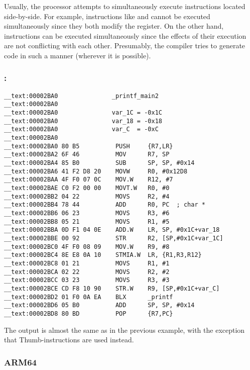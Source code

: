 Usually, the processor attempts to simultaneously execute instructions located side-by-side.
For example, instructions like  and
 cannot be executed simultaneously since they both modify the  register. 
On the other hand,  \AndENRU {} 
instructions can be executed
simultaneously since the effects of their execution are not conflicting with each other.
Presumably, the compiler tries to generate code in such a manner (wherever it is possible).
 
\subsubsection{\OptimizingXcodeIV: \ThumbTwoMode}

\begin{lstlisting}
__text:00002BA0               _printf_main2
__text:00002BA0
__text:00002BA0               var_1C = -0x1C
__text:00002BA0               var_18 = -0x18
__text:00002BA0               var_C  = -0xC
__text:00002BA0
__text:00002BA0 80 B5          PUSH     {R7,LR}
__text:00002BA2 6F 46          MOV      R7, SP
__text:00002BA4 85 B0          SUB      SP, SP, #0x14
__text:00002BA6 41 F2 D8 20    MOVW     R0, #0x12D8
__text:00002BAA 4F F0 07 0C    MOV.W    R12, #7
__text:00002BAE C0 F2 00 00    MOVT.W   R0, #0
__text:00002BB2 04 22          MOVS     R2, #4
__text:00002BB4 78 44          ADD      R0, PC  ; char *
__text:00002BB6 06 23          MOVS     R3, #6
__text:00002BB8 05 21          MOVS     R1, #5
__text:00002BBA 0D F1 04 0E    ADD.W    LR, SP, #0x1C+var_18
__text:00002BBE 00 92          STR      R2, [SP,#0x1C+var_1C]
__text:00002BC0 4F F0 08 09    MOV.W    R9, #8
__text:00002BC4 8E E8 0A 10    STMIA.W  LR, {R1,R3,R12}
__text:00002BC8 01 21          MOVS     R1, #1
__text:00002BCA 02 22          MOVS     R2, #2
__text:00002BCC 03 23          MOVS     R3, #3
__text:00002BCE CD F8 10 90    STR.W    R9, [SP,#0x1C+var_C]
__text:00002BD2 01 F0 0A EA    BLX      _printf
__text:00002BD6 05 B0          ADD      SP, SP, #0x14
__text:00002BD8 80 BD          POP      {R7,PC}
\end{lstlisting}

The output is almost the same as in the previous example, with the exception that Thumb-instructions are used instead.

\subsubsection{ARM64}

